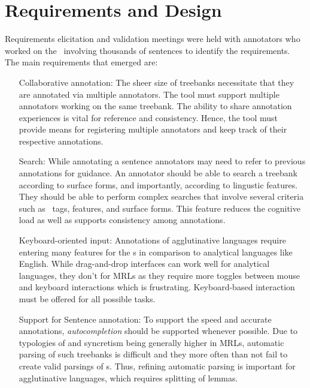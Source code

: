 \section{Requirements and Design}
\label{sec:requirements}


Requirements elicitation and validation meetings were held with annotators who worked on the  \bountreebank\ involving thousands of sentences to identify the requirements.
The main requirements that emerged are:
\begin{itemize}[before=\normalfont, font=\itshape, align=left,noitemsep,topsep=0pt,parsep=0pt,partopsep=0pt,labelwidth=5cm,align=left,itemindent=5cm]
    \item[Collaborative annotation:]
        The sheer size of treebanks necessitate that they are annotated via multiple annotators.
        The tool must support multiple annotators working on the same treebank.
        The ability to share annotation experiences is vital for reference and consistency.
        Hence, the tool must provide means for registering multiple annotators and keep track of their respective annotations.
    \item[Search:]
        While annotating a sentence annotators may need to refer to previous annotations for guidance.
        An annotator should be able to search a treebank according to surface forms, and importantly, according to lingustic features.
        They should be able to perform complex searches that involve several criteria such as \ud\ tags, features, and surface forms.
        This feature reduces the cognitive load as well as supports consistency among annotations.
    \item[Keyboard-oriented input:]
        Annotations of agglutinative languages require entering many features for the \form s in comparison to analytical languages like English.
        While drag-and-drop interfaces can work well for analytical languages, they don't for MRLs as they require more toggles between mouse and keyboard interactions which is frustrating.
        Keyboard-based interaction must be offered for all possible tasks.
    \item[Support for Sentence annotation:]
        To support the speed and accurate annotations, \textit{autocompletion} should be supported whenever possible.
        Due to typologies of and syncretism being generally higher in MRLs, automatic parsing of such treebanks is difficult and they more often than not fail to create valid parsings of \form s.
        Thus, refining automatic parsing is important for agglutinative languages, which requires splitting of lemmas.

\end{itemize}
